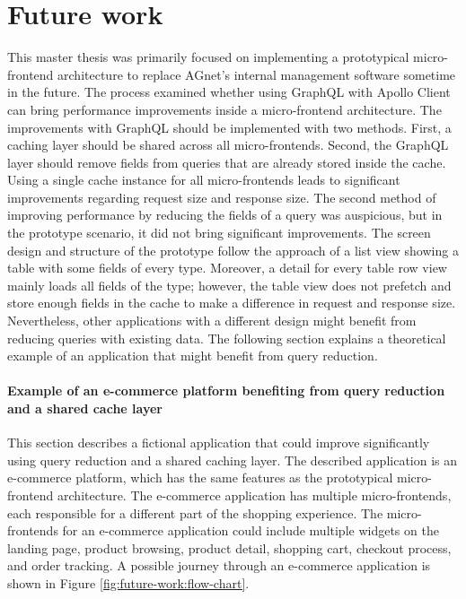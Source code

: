 \chapter{Future work}\label{chapter:future-work}

This master thesis was primarily focused on implementing a prototypical micro-frontend architecture to replace AGnet's internal management software sometime in the future. The process examined whether using GraphQL with Apollo Client can bring performance improvements inside a micro-frontend architecture. The improvements with GraphQL should be implemented with two methods. First, a caching layer should be shared across all micro-frontends. Second, the GraphQL layer should remove fields from queries that are already stored inside the cache. Using a single cache instance for all micro-frontends leads to significant improvements regarding request size and response size. The second method of improving performance by reducing the fields of a query was auspicious, but in the prototype scenario, it did not bring significant improvements. The screen design and structure of the prototype follow the approach of a list view showing a table with some fields of every type. Moreover, a detail for every table row view mainly loads all fields of the type; however, the table view does not prefetch and store enough fields in the cache to make a difference in request and response size. Nevertheless, other applications with a different design might benefit from reducing queries with existing data. The following section explains a theoretical example of an application that might benefit from query reduction.

\subsubsection{Example of an e-commerce platform benefiting from query reduction and a shared cache layer}

This section describes a fictional application that could improve significantly using query reduction and a shared caching layer. The described application is an e-commerce platform, which has the same features as the prototypical micro-frontend architecture. The e-commerce application has multiple micro-frontends, each responsible for a different part of the shopping experience. The micro-frontends for an e-commerce application could include multiple widgets on the landing page, product browsing, product detail, shopping cart, checkout process, and order tracking. A possible journey through an e-commerce application is shown in Figure \ref{fig:future-work:flow-chart}.


